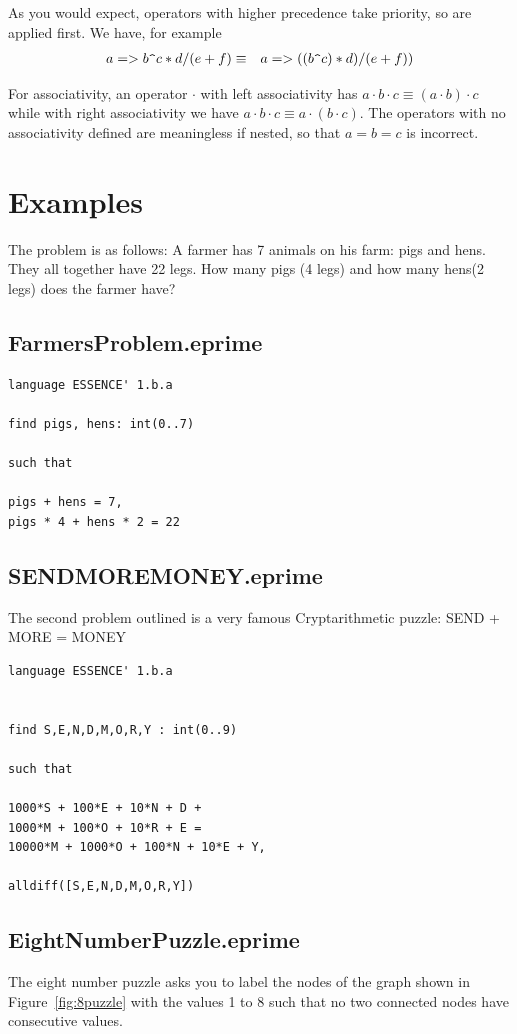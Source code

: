 \documentclass[oneside]{book}
\begin{document}
As you would expect, operators with higher precedence take priority, so are applied first.   We have, for example 
\begin{eqnarray*}
a => b \verb.^. c * d / ( e + f ) & \equiv & a => ( (b \verb.^. c) * d ) /  (e + f) )
\end{eqnarray*}

For associativity, an operator $\cdot$ with left associativity has 
$a \cdot b \cdot c \equiv  ( a \cdot b) \cdot c$ while with right associativity we have 
$a \cdot b \cdot  c \equiv a \cdot (b \cdot c)$.   The operators with no associativity defined are meaningless if nested, so that $a = b = c$ is incorrect.    



\section{Examples} 
The problem is as follows:  A farmer has 7 animals on his farm: pigs and hens. They all together have 22 legs. How many pigs (4 legs) and how many hens(2 legs) does the farmer have?
\subsection{FarmersProblem.eprime}\label{sect:farmers}

\begin{verbatim}
language ESSENCE' 1.b.a

find pigs, hens: int(0..7)

such that

pigs + hens = 7,
pigs * 4 + hens * 2 = 22
\end{verbatim}

\subsection{SENDMOREMONEY.eprime}\label{sect:crypt}
The second problem outlined is a very famous Cryptarithmetic puzzle: SEND + MORE = MONEY
\begin{verbatim}
language ESSENCE' 1.b.a


find S,E,N,D,M,O,R,Y : int(0..9)

such that

1000*S + 100*E + 10*N + D + 
1000*M + 100*O + 10*R + E =
10000*M + 1000*O + 100*N + 10*E + Y,

alldiff([S,E,N,D,M,O,R,Y])
\end{verbatim}

\subsection{EightNumberPuzzle.eprime}\label{sect:8number}
The eight number puzzle asks you to label the nodes of the graph shown in Figure~\ref{fig:8puzzle} with the values 1 to 8 such that no two connected nodes have consecutive values.
\end{document}
